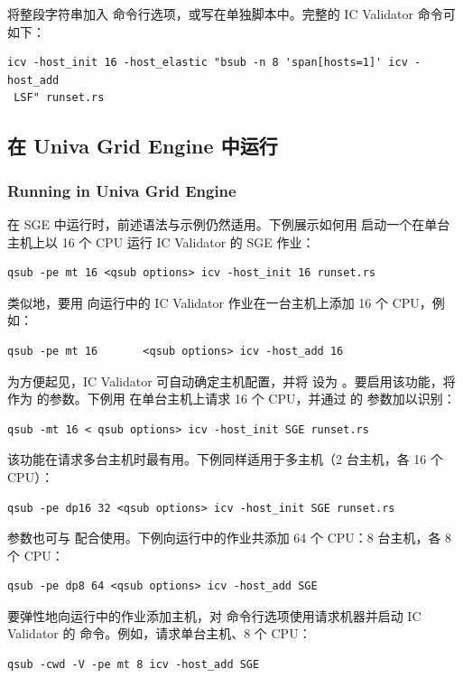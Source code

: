 将整段字符串加入  命令行选项，或写在单独脚本中。完整的 IC Validator 命令可如下：
\begin{lstlisting}
icv -host_init 16 -host_elastic "bsub -n 8 'span[hosts=1]' icv -host_add
 LSF" runset.rs
\end{lstlisting}

\subsection{在 Univa Grid Engine 中运行}
\subsubsection*{Running in Univa Grid Engine}

在 SGE 中运行时，前述语法与示例仍然适用。下例展示如何用  启动一个在单台主机上以 16 个 CPU 运行 IC Validator 的 SGE 作业：
\begin{lstlisting}
qsub -pe mt 16 <qsub options> icv -host_init 16 runset.rs
\end{lstlisting}

类似地，要用  向运行中的 IC Validator 作业在一台主机上添加 16 个 CPU，例如：
\begin{lstlisting}
qsub -pe mt 16       <qsub options> icv -host_add 16
\end{lstlisting}

为方便起见，IC Validator 可自动确定主机配置，并将  设为 。要启用该功能，将  作为  的参数。下例用  在单台主机上请求 16 个 CPU，并通过  的  参数加以识别：
\begin{lstlisting}
qsub -mt 16 < qsub options> icv -host_init SGE runset.rs
\end{lstlisting}

该功能在请求多台主机时最有用。下例同样适用于多主机（2 台主机，各 16 个 CPU）：
\begin{lstlisting}
qsub -pe dp16 32 <qsub options> icv -host_init SGE runset.rs
\end{lstlisting}

 参数也可与  配合使用。下例向运行中的作业共添加 64 个 CPU：8 台主机，各 8 个 CPU：
\begin{lstlisting}
qsub -pe dp8 64 <qsub options> icv -host_add SGE
\end{lstlisting}

要弹性地向运行中的作业添加主机，对  命令行选项使用请求机器并启动 IC Validator 的  命令。例如，请求单台主机、8 个 CPU：
\begin{lstlisting}
qsub -cwd -V -pe mt 8 icv -host_add SGE
\end{lstlisting}

